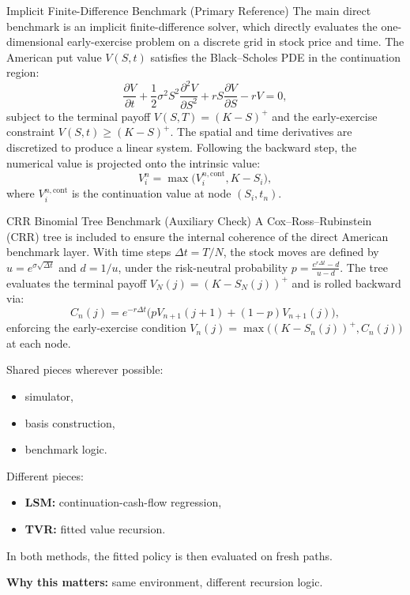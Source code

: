 \documentclass[
  11pt,
  ignorenonframetext,
  aspectratio=169,
]{beamer}
\providecommand{\tightlist}{%
  \setlength{\itemsep}{0pt}\setlength{\parskip}{0pt}}
\begin{document}
\begin{frame}{Implicit Finite-Difference Benchmark (Primary Reference)}
\label{implicit-finite-difference-benchmark-primary-reference}
The main direct benchmark is an implicit finite-difference solver, which
directly evaluates the one-dimensional early-exercise problem on a
discrete grid in stock price and time. The American put value \(V(S,t)\)
satisfies the Black--Scholes PDE in the continuation region: \[
\frac{\partial V}{\partial t} + \frac{1}{2}\sigma^2 S^2 \frac{\partial^2 V}{\partial S^2} + rS \frac{\partial V}{\partial S} - rV = 0,
\] subject to the terminal payoff \(V(S,T) = (K-S)^+\) and the
early-exercise constraint \(V(S,t) \ge (K-S)^+\). The spatial and time
derivatives are discretized to produce a linear system. Following the
backward step, the numerical value is projected onto the intrinsic
value: \[
V_i^{n} = \max \bigl(V_i^{n,\text{cont}}, K-S_i\bigr),
\] where \(V_i^{n,\text{cont}}\) is the continuation value at node
\((S_i,t_n)\).
\end{frame}

\begin{frame}{CRR Binomial Tree Benchmark (Auxiliary Check)}
\label{crr-binomial-tree-benchmark-auxiliary-check}
A Cox--Ross--Rubinstein (CRR) tree is included to ensure the internal
coherence of the direct American benchmark layer. With time steps
\(\Delta t = T/N\), the stock moves are defined by
\(u = e^{\sigma \sqrt{\Delta t}}\) and \(d = 1/u\), under the
risk-neutral probability \(p = \frac{e^{r\Delta t} - d}{u-d}\). The tree
evaluates the terminal payoff \(V_N(j) = (K - S_N(j))^+\) and is rolled
backward via: \[
C_n(j) = e^{-r\Delta t}\bigl(p V_{n+1}(j+1) + (1-p)V_{n+1}(j)\bigr),
\] enforcing the early-exercise condition
\(V_n(j) = \max \bigl((K-S_n(j))^+, C_n(j)\bigr)\) at each node.
\end{frame}

\begin{frame}{}
\label{section}
Shared pieces wherever possible:

\begin{itemize}
\tightlist
\item
  simulator,
\item
  basis construction,
\item
  benchmark logic.
\end{itemize}

Different pieces:

\begin{itemize}
\tightlist
\item
  \textbf{LSM:} continuation-cash-flow regression,
\item
  \textbf{TVR:} fitted value recursion.
\end{itemize}

In both methods, the fitted policy is then evaluated on fresh paths.

\textbf{Why this matters:} same environment, different recursion logic.
\end{frame}
\end{document}
